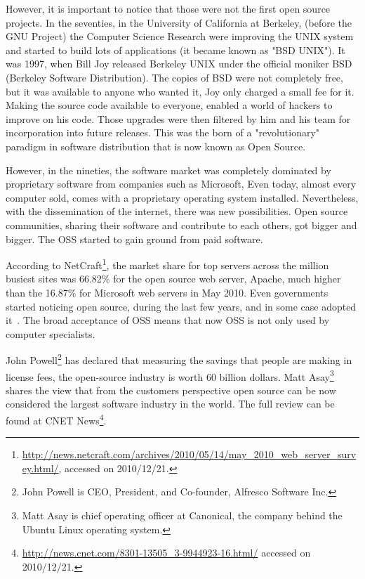 However, it is important to notice that those were not the first open source projects. 
In the seventies, in the University of California at Berkeley, 
(before the GNU Project) the Computer Science Research 
were improving the UNIX system and started to build lots of applications (it became known as "BSD UNIX").
It was 1997, when Bill Joy released Berkeley UNIX under the official moniker BSD (Berkeley Software Distribution).
The copies of BSD were not completely free, but it was available to anyone who wanted it,
Joy only charged a small fee for it.
Making the source code available to everyone, enabled a world of hackers to improve on his code. 
Those upgrades were then filtered by him and his team for incorporation into future releases. 
This was the born of a "revolutionary" paradigm in software distribution that is now known as Open Source.

However, in the nineties, the software market was completely dominated 
by proprietary software from companies such as Microsoft,
Even today, almost every computer sold,
comes with a proprietary operating system installed.
Nevertheless, with the dissemination of the internet, there was new possibilities. 
Open source communities, sharing their software and contribute to each others, got bigger and bigger.
The OSS started to gain ground from paid software.

According to \textsf{NetCraft}\footnote{\url{http://news.netcraft.com/archives/2010/05/14/may\_2010\_web\_server\_survey.html/}, accessed on 2010/12/21.},
the market share for top servers across the million busiest sites was 66.82\% for the open source web server, Apache,
much higher than the 16.87\% for Microsoft web servers in May 2010.
Even governments started noticing open source, during the last few years, and in some case adopted it~\cite{hahn2002government}.
The broad acceptance of OSS means that now OSS is not only used by computer specialists.

\textsf{John Powell}\footnote{John Powell is CEO, President, and Co-founder, Alfresco Software Inc.}
has declared that measuring the savings that people are making in license fees, the open-source industry is worth 60 billion dollars.
\textsf{Matt Asay}\footnote{Matt Asay is chief operating officer at Canonical, the company behind the Ubuntu Linux operating system.}
shares the view that from the customers perspective open source can be now considered the largest software industry in the world.
The full review can be found at \textsf{CNET News}\footnote{\url{http://news.cnet.com/8301-13505\_3-9944923-16.html/} accessed on 2010/12/21.}. 

